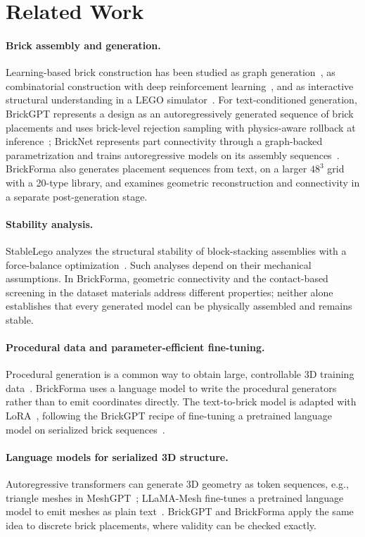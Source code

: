 \documentclass[letterpaper]{article} %
\begin{document}
\section{Related Work}
\paragraph{Brick assembly and generation.}
Learning-based brick construction has been studied as graph generation~\cite{thompson2020lego}, as combinatorial construction with deep reinforcement learning~\cite{brickbybrick}, and as interactive structural understanding in a LEGO simulator~\cite{breakandmake}. For text-conditioned generation, BrickGPT represents a design as an autoregressively generated sequence of brick placements and uses brick-level rejection sampling with physics-aware rollback at inference~\cite{brickgpt}; BrickNet represents part connectivity through a graph-backed parametrization and trains autoregressive models on its assembly sequences~\cite{bricknet}. BrickForma also generates placement sequences from text, on a larger $48^3$ grid with a 20-type library, and examines geometric reconstruction and connectivity in a separate post-generation stage.

\paragraph{Stability analysis.}
StableLego analyzes the structural stability of block-stacking assemblies with a force-balance optimization~\cite{stablelego}. Such analyses depend on their mechanical assumptions. In BrickForma, geometric connectivity and the contact-based screening in the dataset materials address different properties; neither alone establishes that every generated model can be physically assembled and remains stable.

\paragraph{Procedural data and parameter-efficient fine-tuning.}
Procedural generation is a common way to obtain large, controllable 3D training data~\cite{infinigen}. BrickForma uses a language model to write the procedural generators rather than to emit coordinates directly. The text-to-brick model is adapted with LoRA~\cite{lora}, following the BrickGPT recipe of fine-tuning a pretrained language model on serialized brick sequences~\cite{brickgpt}.

\paragraph{Language models for serialized 3D structure.}
Autoregressive transformers can generate 3D geometry as token sequences, e.g., triangle meshes in MeshGPT~\cite{meshgpt}; LLaMA-Mesh fine-tunes a pretrained language model to emit meshes as plain text~\cite{llamamesh}. BrickGPT and BrickForma apply the same idea to discrete brick placements, where validity can be checked exactly.
\end{document}
